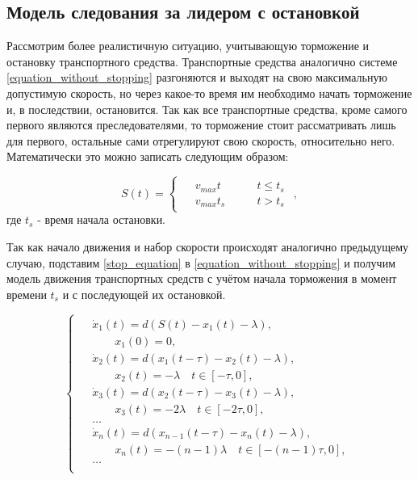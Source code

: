 \documentclass[12pt, a4paper]{extarticle}
\numberwithin{equation}{section}
\begin{document}
\subsection{Модель следования за лидером с остановкой}

Рассмотрим более реалистичную ситуацию, учитывающую торможение и остановку транспортного средства. Транспортные средства аналогично системе \eqref{equation_without_stopping} разгоняются и выходят на свою максимальную допустимую скорость, но через какое-то время им необходимо начать торможение и, в последствии, остановится. Так как все транспортные средства, кроме самого первого являются преследователями, то торможение стоит рассматривать лишь для первого, остальные сами отрегулируют свою скорость, относительно него. Математически это можно записать следующим образом:
  
\begin{equation} \label{stop_equation}
 S(t) = 
 \begin{cases}
 \begin{split}
 &v_{max} t \qquad &t \leqslant t_s \\
 &v_{max} t_s \qquad &t > t_s
 \end{split}
 \end{cases},
\end{equation}
где $t_s$ - время начала остановки.

Так как начало движения и набор скорости происходят аналогично предыдущему случаю, подставим  \eqref{stop_equation} в \eqref{equation_without_stopping} и получим модель движения транспортных средств с учётом начала торможения в момент времени $t_s$ и с последующей их остановкой. 
  
\begin{equation} \label{equation_with_stopping}
\begin{cases}
\begin{split}
&\dot{x}_1(t) = d (S(t) - x_1(t) - \lambda), \\ 
&\qquad x_1(0) = 0, \\
&\dot{x}_2(t) = d (x_1(t-\tau)-x_2(t) - \lambda), \\
&\qquad x_2(t) = -\lambda \quad t \in [-\tau, 0], \\
&\dot{x}_3(t) = d (x_2(t-\tau)-x_3(t) - \lambda), \\
&\qquad x_3(t) = -2\lambda \quad t \in [-2\tau, 0], \\
&\ldots \\
&\dot{x}_n(t) = d ({x}_{n-1}(t-\tau)-x_n(t) - \lambda), \\
&\qquad x_n(t) = -(n-1)\lambda \quad t \in [-(n-1)\tau, 0], \\
&\ldots \\
\end{split}
\end{cases}
\end{equation}
\end{document}
